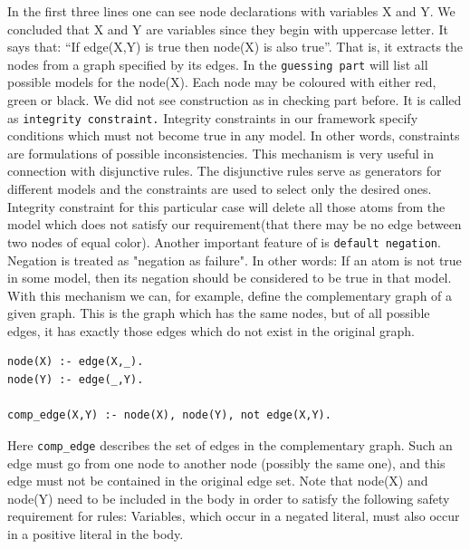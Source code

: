 \documentclass[14pt,a4paper, titlepage]{article}
\begin{document}
In the first three lines one can see node declarations with variables X and Y. We concluded that X and Y are variables since they begin with uppercase letter. It says that: \enquote{If edge(X,Y) is true then node(X) is also true}. That is, it extracts the nodes from a graph specified by its edges. In the \texttt{guessing part} \dlvhex{} will list all possible models for the node(X). Each node may be coloured with either red, green or black. We did not see construction as in checking part before. It is called as \texttt{integrity constraint.} Integrity constraints in our framework specify conditions which must not become true in any model. In other words, constraints are formulations of possible inconsistencies. This mechanism is very useful in connection with disjunctive rules. The disjunctive rules serve as generators for different models and the constraints are used to select only the desired ones. Integrity constraint for this particular case will delete all those atoms from the model which does not satisfy our requirement(that there may be no edge between two nodes of equal color). Another important feature of \dlvhex{} is \texttt{default negation}. Negation is treated as "negation as failure". In other words: If an atom is not true in some model, then its negation should be considered to be true in that model. With this mechanism we can, for example, define the complementary graph of a given graph. This is the graph which has the same nodes, but of all possible edges, it has exactly those edges which do not exist in the original graph. \newpage
\begin{lstlisting}
node(X) :- edge(X,_).
node(Y) :- edge(_,Y).

comp_edge(X,Y) :- node(X), node(Y), not edge(X,Y).
\end{lstlisting}
Here \texttt{comp\_edge} describes the set of edges in the complementary graph. Such an edge must go from one node to another node (possibly the same one), and this edge must not be contained in the original edge set. Note that node(X) and node(Y) need to be included in the body in order to satisfy the following safety requirement for rules: Variables, which occur in a negated literal, must also occur in a positive literal in the body.
\end{document}
